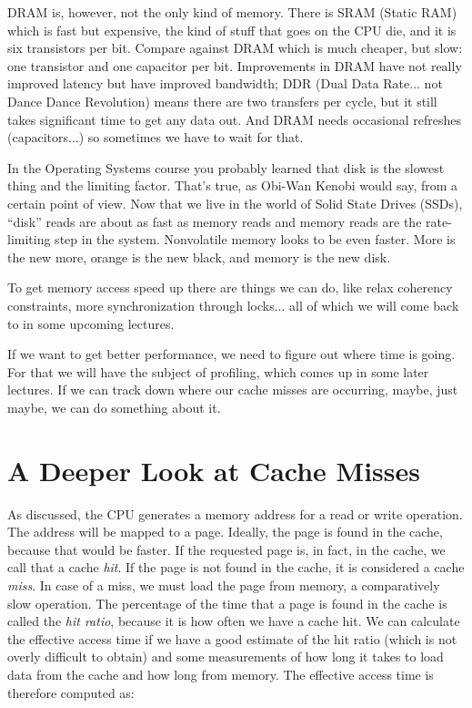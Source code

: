 \documentclass[a4paper]{report}
\begin{document}
DRAM is, however, not the only kind of memory. There is SRAM (Static RAM) which is fast but expensive, the kind of stuff that goes on the CPU die, and it is six transistors per bit. Compare against DRAM which is much cheaper, but slow: one transistor and one capacitor per bit. Improvements in DRAM have not really improved latency but have improved bandwidth; DDR (Dual Data Rate... not Dance Dance Revolution) means there are two transfers per cycle, but it still takes significant time to get any data out. And DRAM needs occasional refreshes (capacitors...) so sometimes we have to wait for that.

In the Operating Systems course you probably learned that disk is the slowest thing and the limiting factor. That's true, as Obi-Wan Kenobi would say, from a certain point of view. Now that we live in the world of Solid State Drives (SSDs), ``disk'' reads are about as fast as memory reads and memory reads are the rate-limiting step in the system. Nonvolatile memory looks to be even faster. More is the new more, orange is the new black, and memory is the new disk.

To get memory access speed up there are things we can do, like relax coherency constraints, more synchronization through locks... all of which we will come back to in some upcoming lectures. 

If we want to get better performance, we need to figure out where time is going. For that we will have the subject of profiling, which comes up in some later lectures. If we can track down where our cache misses are occurring, maybe, just maybe, we can do something about it. 

\section*{A Deeper Look at Cache Misses}

As discussed, the CPU generates a memory address for a read or write operation. The address will be mapped to a page. Ideally, the page is found in the cache, because that would be faster. If the requested page is, in fact,  in the cache, we call that a cache \textit{hit}. If the page is not found in the cache, it is considered a cache \textit{miss}. In case of a miss, we must load the page from memory, a comparatively slow operation. The percentage of the time that a page is found in the cache is called the \textit{hit ratio}, because it is how often we have a cache hit. We can calculate the effective access time if we have a good estimate of the hit ratio (which is not overly difficult to obtain) and some measurements of how long it takes to load data from the cache and how long from memory. The effective access time is therefore computed as:
\end{document}
